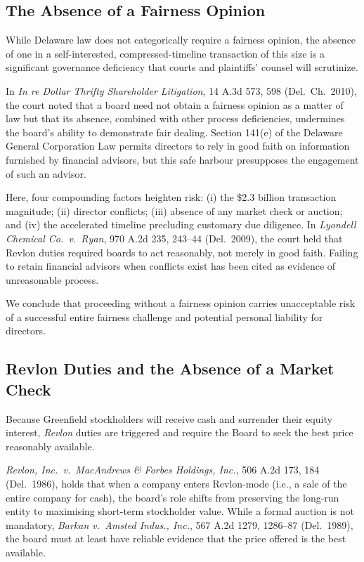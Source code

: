 \hairrule

\subsection{The Absence of a Fairness Opinion}

While Delaware law does not categorically require a fairness opinion, the absence of one in a self-interested, compressed-timeline transaction of this size is a significant governance deficiency that courts and plaintiffs' counsel will scrutinize.

In \textit{In re Dollar Thrifty Shareholder Litigation}, 14 A.3d 573, 598 (Del.\ Ch.\ 2010), the court noted that a board need not obtain a fairness opinion as a matter of law but that its absence, combined with other process deficiencies, undermines the board's ability to demonstrate fair dealing.  Section 141(e) of the Delaware General Corporation Law permits directors to rely in good faith on information furnished by financial advisors, but this safe harbour presupposes the engagement of such an advisor.

Here, four compounding factors heighten risk: (i) the \$2.3 billion transaction magnitude; (ii) director conflicts; (iii) absence of any market check or auction; and (iv) the accelerated timeline precluding customary due diligence.  In \textit{Lyondell Chemical Co.\ v.\ Ryan}, 970 A.2d 235, 243--44 (Del.\ 2009), the court held that Revlon duties required boards to act reasonably, not merely in good faith.  Failing to retain financial advisors when conflicts exist has been cited as evidence of unreasonable process.

We conclude that proceeding without a fairness opinion carries unacceptable risk of a successful entire fairness challenge and potential personal liability for directors.

\hairrule

\subsection{Revlon Duties and the Absence of a Market Check}

Because Greenfield stockholders will receive cash and surrender their equity interest, \textit{Revlon} duties are triggered and require the Board to seek the best price reasonably available.

\textit{Revlon, Inc.\ v.\ MacAndrews \& Forbes Holdings, Inc.}, 506 A.2d 173, 184 (Del.\ 1986), holds that when a company enters Revlon-mode (i.e., a sale of the entire company for cash), the board's role shifts from preserving the long-run entity to maximising short-term stockholder value.  While a formal auction is not mandatory, \textit{Barkan v.\ Amsted Indus., Inc.}, 567 A.2d 1279, 1286--87 (Del.\ 1989), the board must at least have reliable evidence that the price offered is the best available.


